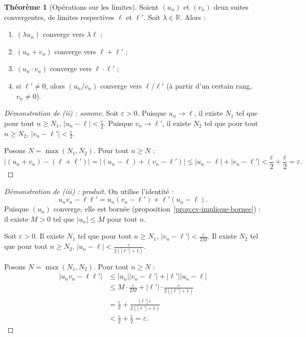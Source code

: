 \documentclass[12pt,a4paper,openany]{book}
\theoremstyle{definition}
\newtheorem{theoreme}{Théorème}[chapter]
\newcommand{\R}{\mathbb{R}}
\newcommand{\eps}{\varepsilon}
\newcommand{\abs}[1]{\left\lvert #1 \right\rvert}
\begin{document}
\begin{theoreme}[Opérations sur les limites]\label{thm:operations-limites}
  Soient $(u_n)$ et $(v_n)$ deux suites convergentes, de limites respectives $\ell$ et $\ell'$.
  Soit $\lambda \in \R$. Alors :
  \begin{enumerate}[label=(\roman*)]
    \item $(\lambda u_n)$ converge vers $\lambda \ell$ ;
    \item $(u_n + v_n)$ converge vers $\ell + \ell'$ ;
    \item $(u_n \cdot v_n)$ converge vers $\ell \cdot \ell'$ ;
    \item si $\ell' \neq 0$, alors $(u_n / v_n)$ converge vers $\ell / \ell'$
      (à partir d'un certain rang, $v_n \neq 0$).
  \end{enumerate}
\end{theoreme}

\begin{proof}[Démonstration de (ii) : somme]
  Soit $\eps > 0$. Puisque $u_n \to \ell$, il existe $N_1$ tel que pour tout $n \geq N_1$,
  $\abs{u_n - \ell} < \frac{\eps}{2}$.
  Puisque $v_n \to \ell'$, il existe $N_2$ tel que pour tout $n \geq N_2$,
  $\abs{v_n - \ell'} < \frac{\eps}{2}$.

  Posons $N = \max(N_1, N_2)$. Pour tout $n \geq N$ :
  \[
    \abs{(u_n + v_n) - (\ell + \ell')}
      = \abs{(u_n - \ell) + (v_n - \ell')}
      \leq \abs{u_n - \ell} + \abs{v_n - \ell'}
      < \frac{\eps}{2} + \frac{\eps}{2} = \eps.
  \]
\end{proof}

\begin{proof}[Démonstration de (iii) : produit]
  On utilise l'identité :
  \[
    u_n v_n - \ell \ell' = u_n(v_n - \ell') + \ell'(u_n - \ell).
  \]
  Puisque $(u_n)$ converge, elle est bornée (proposition~\ref{prop:cv-implique-bornee}) :
  il existe $M > 0$ tel que $\abs{u_n} \leq M$ pour tout $n$.

  Soit $\eps > 0$. Il existe $N_1$ tel que pour tout $n \geq N_1$,
  $\abs{v_n - \ell'} < \frac{\eps}{2M}$.
  Il existe $N_2$ tel que pour tout $n \geq N_2$,
  $\abs{u_n - \ell} < \frac{\eps}{2(\abs{\ell'} + 1)}$.

  Posons $N = \max(N_1, N_2)$. Pour tout $n \geq N$ :
  \begin{align*}
    \abs{u_n v_n - \ell \ell'}
      &\leq \abs{u_n}\abs{v_n - \ell'} + \abs{\ell'}\abs{u_n - \ell} \\
      &\leq M \cdot \frac{\eps}{2M} + \abs{\ell'} \cdot \frac{\eps}{2(\abs{\ell'} + 1)} \\
      &= \frac{\eps}{2} + \frac{\abs{\ell'}\,\eps}{2(\abs{\ell'} + 1)} \\
      &< \frac{\eps}{2} + \frac{\eps}{2} = \eps.
  \end{align*}
\end{proof}
\end{document}
